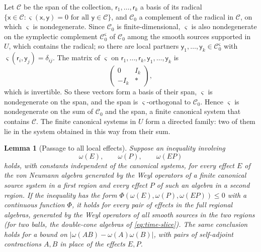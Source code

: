 \documentclass[11pt]{amsart}
\numberwithin{equation}{section}
\newtheorem{lemma}[theorem]{Lemma}
\theoremstyle{definition}
\newcommand{\sx}{\mathsf x}
\newcommand{\sy}{\mathsf y}
\begin{document}
Let \(\mathcal C\) be the span of the collection,
\(\mathsf r_1,\dots,\mathsf r_k\) a basis of its radical
\(\{\sx\in\mathcal C:\varsigma(\sx,\sy)=0\text{ for all }\sy\in\mathcal C\}\),
and \(\mathcal C_0\) a complement of the radical in \(\mathcal C\), on
which \(\varsigma\) is nondegenerate. Since \(\mathcal C_0\) is
finite-dimensional, \(\varsigma\) is also nondegenerate on the
symplectic complement \(\mathcal C_0^{\varsigma}\) of \(\mathcal C_0\)
among the smooth sources supported in \(U\), which contains the
radical; so there are local partners
\(\sy_1,\dots,\sy_k\in\mathcal C_0^{\varsigma}\) with
\(\varsigma(\mathsf r_i,\sy_j)=\delta_{ij}\). The matrix of
\(\varsigma\) on \(\mathsf r_1,\dots,\mathsf r_k,\sy_1,\dots,\sy_k\) is
\[
 \begin{pmatrix}0&I_k\\-I_k&\ast\end{pmatrix},
\]
which is invertible. So these vectors form a basis of their span,
\(\varsigma\) is nondegenerate on the span, and the span is
\(\varsigma\)-orthogonal to \(\mathcal C_0\). Hence \(\varsigma\) is
nondegenerate on the sum of \(\mathcal C_0\) and the span, a finite
canonical system that contains \(\mathcal C\). The finite
canonical systems in \(U\) form a directed family: two of them lie in the system obtained
in this way from their sum.

\begin{lemma}[Passage to all local effects]\label{lem:exhaustion}
Suppose an inequality involving
\[
 \omega(E),\qquad \omega(P),\qquad \omega(EP)
\]
holds, with constants independent of the canonical systems, for every
effect \(E\) of the von Neumann algebra generated by the Weyl operators
of a finite canonical source system in a first region and every effect
\(P\) of such an algebra in a second region. If the inequality has the
form \(\Phi(\omega(E),\omega(P),\omega(EP))\le0\) with a continuous
function \(\Phi\), it holds for every pair of effects in the full
regional algebras, generated by the Weyl operators of all smooth
sources in the two regions (for two balls, the double-cone algebras of
\eqref{eq:time-slice}). The same conclusion holds for a bound on
\(|\omega(AB)-\omega(A)\omega(B)|\), with pairs of self-adjoint
contractions \(A,B\) in place of the effects \(E,P\).
\end{lemma}
\end{document}
